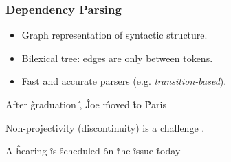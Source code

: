\documentclass[t]{beamer}
\begin{document}
\begin{frame}
\frametitle{Dependency Parsing}
\begin{itemize}
	\item Graph representation of syntactic structure.
	\item Bilexical tree: edges are only between tokens.
	\item Fast and accurate parsers (e.g. \textit{transition-based}).
\end{itemize}
\vfill
\begin{adjustbox}{frame,center}
\begin{dependency}
	\begin{deptext}[column sep=1.5em,ampersand replacement=\^,font=\rmfamily]
	After \^ graduation \^ , \^ Joe \^ moved \^ to \^ Paris \\
	\end{deptext}
\end{dependency}
\end{adjustbox}

\pause
Non-projectivity (discontinuity) is a challenge \cite{nivre2009non}.
\begin{adjustbox}{scale=.8,frame,center}
\begin{dependency}
	\begin{deptext}[column sep=1.2em,ampersand replacement=\^,font=\rmfamily]
	A \^ hearing \^ is \^ scheduled \^ on \^ the \^ issue \^ today \\
	\end{deptext}
\end{dependency}
\end{adjustbox}
\end{frame}
\end{document}
